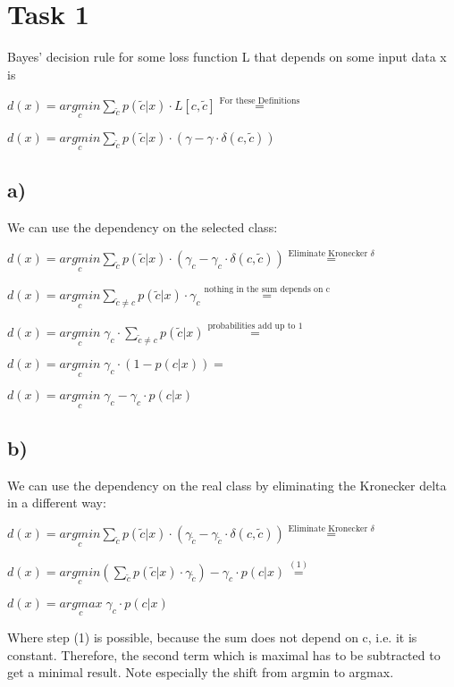 \documentclass[%
   11pt,              %
   ngerman,           %
   a4paper,           %
   DIV11,             %
]{scrartcl}%
\begin{document}
\section*{Task 1}
Bayes' decision rule for some loss function L that depends on some input data x is 

$d(x) = \underset{c}{arg min} \displaystyle\sum_{\tilde{c}} p(\tilde{c}|x) \cdot L[c,\tilde{c}] \stackrel{\text{For these Definitions}}{=}$

$d(x) = \underset{c}{arg min} \displaystyle\sum_{\tilde{c}} p(\tilde{c}|x) \cdot (\gamma - \gamma \cdot \delta(c,\tilde{c}))$


\subsection*{a)}
We can use the dependency on the selected class:

$d(x) = \underset{c}{arg min} \displaystyle\sum_{\tilde{c}} p(\tilde{c}|x) \cdot (\gamma_c - \gamma_c \cdot \delta(c,\tilde{c})) \stackrel{\text{Eliminate Kronecker }\delta}{=}$

$d(x) = \underset{c}{arg min} \displaystyle\sum_{\tilde{c}\neq c} p(\tilde{c}|x) \cdot \gamma_c \stackrel{\text{nothing in the sum depends on c}}{=}$

$d(x) = \underset{c}{arg min} \; \gamma_c\cdot\displaystyle\sum_{\tilde{c}\neq c} p(\tilde{c}|x) \stackrel{\text{probabilities add up to 1}}{=}$

$d(x) = \underset{c}{arg min} \; \gamma_c \cdot (1 - p(c | x))=$

$d(x) = \underset{c}{arg min} \; \gamma_c - \gamma_c \cdot p(c | x)$

\subsection*{b)}
We can use the dependency on the real class by eliminating the Kronecker delta in a different way:

$d(x) = \underset{c}{arg min} \displaystyle\sum_{\tilde{c}} p(\tilde{c}|x) \cdot (\gamma_{\tilde{c}} - \gamma_{\tilde{c}} \cdot \delta(c,\tilde{c})) \stackrel{\text{Eliminate Kronecker }\delta}{=}$

$d(x) = \underset{c}{arg min} (\displaystyle\sum_{\tilde{c}} p(\tilde{c}|x) \cdot \gamma_{\tilde{c}}) - \gamma_{c} \cdot p(c|x) \stackrel{(1)}{=}$

$d(x) = \underset{c}{arg max}\;  \gamma_{c} \cdot p(c|x)$

Where step (1) is possible, because the sum does not depend on c, i.e. it is constant. Therefore, the second term which is maximal has to be subtracted to get a minimal result. Note especially the shift from argmin to argmax.
\
\end{document}
